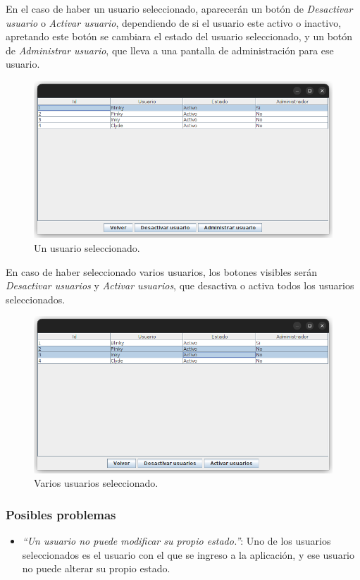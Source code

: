 \documentclass{article}
\begin{document}
En el caso de haber un usuario seleccionado, aparecerán un botón de \emph{Desactivar usuario} o \emph{Activar usuario}, dependiendo de si el usuario este activo o inactivo, apretando este botón se cambiara el estado del usuario seleccionado, y un botón de \emph{Administrar usuario}, que lleva a una pantalla de administración para ese usuario.

\newpage

\begin{figure}[h]
    \centering
    \includegraphics[width=0.7\linewidth,keepaspectratio]{list-users-one-selected.png}
    \caption{Un usuario seleccionado.}
\end{figure}

En caso de haber seleccionado varios usuarios, los botones visibles serán \emph{Desactivar usuarios} y \emph{Activar usuarios}, que desactiva o activa todos los usuarios seleccionados.

\begin{figure}[h]
    \centering
    \includegraphics[width=0.7\linewidth,keepaspectratio]{list-users-many-selected.png}
    \caption{Varios usuarios seleccionado.}
\end{figure}
\subsubsection*{Posibles problemas}

\begin{itemize}
    \item \emph{``Un usuario no puede modificar su propio estado.''}: Uno de los usuarios seleccionados es el usuario con el que se ingreso a la aplicación, y ese usuario no puede alterar su propio estado.
\end{itemize}
\end{document}
